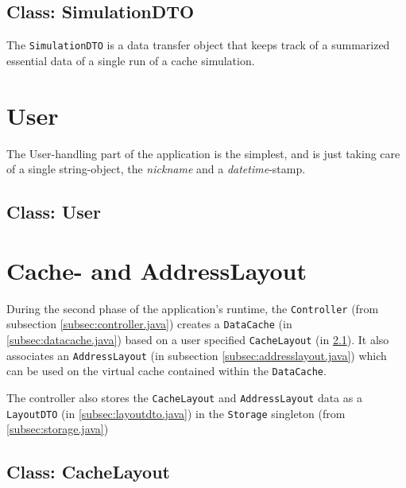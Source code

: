 \documentclass[a4paper]{scrreprt}
\begin{document}


\subsection{Class: SimulationDTO}
\label{subsec:simulationdto.java}

The \texttt{SimulationDTO} is a data transfer object that keeps track of a summarized essential data of a single run of a cache simulation.



\section{User}
\label{sec:user}

The User-handling part of the application is the simplest, and is just taking care of a single string-object, the \textit{nickname} and a \textit{datetime}-stamp.

\subsection{Class: User}
\label{subsec:user.java}


\section{Cache- and AddressLayout}
\label{sec:cache}

During the second phase of the application's runtime, the \texttt{Controller} (from subsection \ref{subsec:controller.java}) creates a \texttt{DataCache} (in \ref{subsec:datacache.java}) based on a user specified \texttt{CacheLayout} (in \ref{subsec:cachelayout.java}). It also associates an \texttt{AddressLayout} (in subsection \ref{subsec:addresslayout.java}) which can be used on the virtual cache contained within the \texttt{DataCache}.

The controller also stores the \texttt{CacheLayout} and \texttt{AddressLayout} data as a \texttt{LayoutDTO} (in \ref{subsec:layoutdto.java}) in the \texttt{Storage} singleton (from \ref{subsec:storage.java}) 

\subsection{Class: CacheLayout}
\label{subsec:cachelayout.java}
\end{document}

